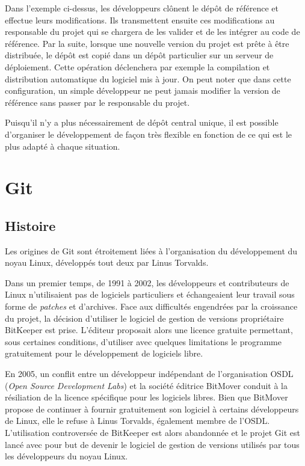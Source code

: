 \documentclass[11pt,a4paper]{article}
\begin{document}
Dans l'exemple ci-dessus, les développeurs clônent le dépôt de référence et effectue leurs modifications.
Ils transmettent ensuite ces modifications au responsable du projet qui se chargera de les valider et de les intégrer au code de référence.
Par la suite, lorsque une nouvelle version du projet est prête à être distribuée, le dépôt est copié dans un dépôt particulier sur un serveur de déploiement.
Cette opération déclenchera par exemple la compilation et distribution automatique du logiciel mis à jour.
On peut noter que dans cette configuration, un simple développeur ne peut jamais modifier la version de référence sans passer par le responsable du projet.

Puisqu'il n'y a plus nécessairement de dépôt central unique, il est possible d'organiser le développement de façon très flexible en fonction de ce qui est le plus adapté à chaque situation.


\pagebreak
\section{Git}

\subsection{Histoire}

Les origines de Git sont étroitement liées à l'organisation du développement du noyau Linux, développés tout deux par Linus Torvalds.

Dans un premier temps, de 1991 à 2002, les développeurs et contributeurs de Linux n'utilisaient pas de logiciels particuliers et échangeaient leur travail sous forme de \textit{patches} et d'archives.
Face aux difficultés engendrées par la croissance du projet, la décision d'utiliser le logiciel de gestion de versions propriétaire BitKeeper est prise.
L'éditeur proposait alors une licence gratuite permettant, sous certaines conditions, d'utiliser avec quelques limitations le programme gratuitement pour le développement de logiciels libre.

En 2005, un conflit entre un développeur indépendant de l'organisation OSDL (\textit{Open Source Development Labs}) et la société éditrice BitMover conduit à la résiliation de la licence spécifique pour les logiciels libres.
Bien que BitMover propose de continuer à fournir gratuitement son logiciel à certains développeurs de Linux, elle le refuse à Linus Torvalds, également membre de l'OSDL.
L'utilisation controversée de BitKeeper est alors abandonnée et le projet Git est lancé avec pour but de devenir le logiciel de gestion de versions utilisés par tous les développeurs du noyau Linux.
\end{document}
